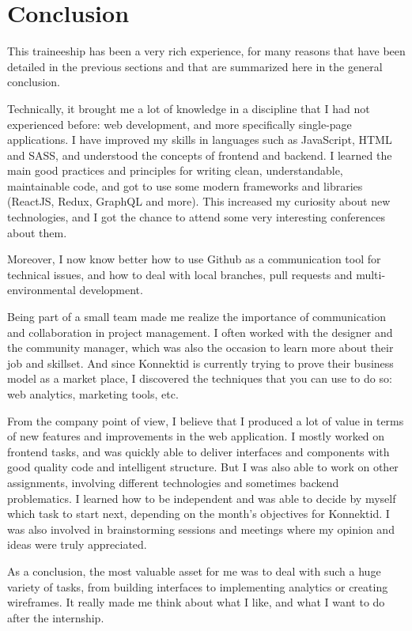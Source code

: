 \section{Conclusion}
\label{sec:conclusion}

This traineeship has been a very rich experience, for many reasons that have been detailed in the previous sections and that are summarized here in the general conclusion.

Technically, it brought me a lot of knowledge in a discipline that I had not experienced before: web development, and more specifically single-page applications. I have improved my skills in languages such as JavaScript, HTML and SASS, and understood the concepts of frontend and backend. I learned the main good practices and principles for writing clean, understandable, maintainable code, and got to use some modern frameworks and libraries (ReactJS, Redux, GraphQL and more). This increased my curiosity about new technologies, and I got the chance to attend some very interesting conferences about them.

Moreover, I now know better how to use Github as a communication tool for technical issues, and how to deal with local branches, pull requests and multi-environmental development.

Being part of a small team made me realize the importance of communication and collaboration in project management. I often worked with the designer and the community manager, which was also the occasion to learn more about their job and skillset. And since Konnektid is currently trying to prove their business model as a market place, I discovered the techniques that you can use to do so: web analytics, marketing tools, etc.

From the company point of view, I believe that I produced a lot of value in terms of new features and improvements in the web application. I mostly worked on frontend tasks, and was quickly able to deliver interfaces and components with good quality code and intelligent structure. But I was also able to work on other assignments, involving different technologies and sometimes backend problematics. I learned how to be independent and was able to decide by myself which task to start next, depending on the month's objectives for Konnektid. I was also involved in brainstorming sessions and meetings where my opinion and ideas were truly appreciated.

As a conclusion, the most valuable asset for me was to deal with such a huge variety of tasks, from building interfaces to implementing analytics or creating wireframes. It really made me think about what I like, and what I want to do after the internship.